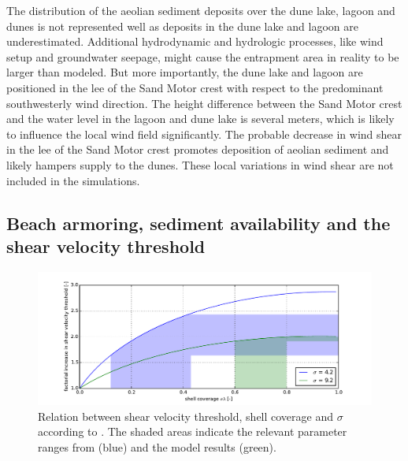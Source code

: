The distribution of the aeolian sediment deposits over the dune lake,
lagoon and dunes is not represented well as deposits in the dune lake
and lagoon are underestimated. Additional hydrodynamic and hydrologic
processes, like wind setup and groundwater seepage, might cause the
entrapment area in reality to be larger than modeled. But more
importantly, the dune lake and lagoon are positioned in the lee of the
Sand Motor crest with respect to the predominant southwesterly wind
direction. The height difference between the Sand Motor crest and the
water level in the lagoon and dune lake is several meters, which is
likely to influence the local wind field significantly. The probable
decrease in wind shear in the lee of the Sand Motor crest promotes
deposition of aeolian sediment and likely hampers supply to the
dunes. These local variations in wind shear are not included in the
simulations.

\subsection{Beach armoring, sediment availability and the shear
  velocity threshold}


\begin{figure}
  \centering
\includegraphics[width=\columnwidth]{../Figures/sigma}
\caption{Relation between shear velocity threshold, shell coverage and
  $\sigma$ according to \citet[][Equation
  \ref{eq:raupach}]{Raupach1993}. The shaded areas indicate the
  relevant parameter ranges from \citet{McKennaNeuman2012} (blue) and
  the model results (green).}
  \label{fig:sigma}
\end{figure}

